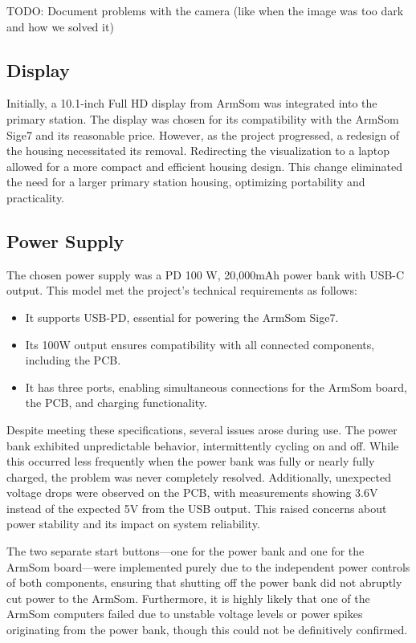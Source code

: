 TODO: Document problems with the camera (like when the image was too dark and how we solved it)

\subsection{Display}
Initially, a 10.1-inch Full HD display from ArmSom was integrated into the primary station. The display was chosen for its compatibility with the ArmSom Sige7 and its reasonable price. However, as the project progressed, a redesign of the housing necessitated its removal. Redirecting the visualization to a laptop allowed for a more compact and efficient housing design. This change eliminated the need for a larger primary station housing, optimizing portability and practicality.

\subsection{Power Supply}
The chosen power supply was a PD 100 W, 20,000mAh power bank with USB-C output. This model met the project's technical requirements as follows:
\begin{itemize}
	\item It supports USB-PD, essential for powering the ArmSom Sige7.
	\item Its 100W output ensures compatibility with all connected components, including the PCB.
	\item It has three ports, enabling simultaneous connections for the ArmSom board, the PCB, and charging functionality.
\end{itemize}

Despite meeting these specifications, several issues arose during use. The power bank exhibited unpredictable behavior, intermittently cycling on and off. While this occurred less frequently when the power bank was fully or nearly fully charged, the problem was never completely resolved. Additionally, unexpected voltage drops were observed on the PCB, with measurements showing 3.6V instead of the expected 5V from the USB output. This raised concerns about power stability and its impact on system reliability.

The two separate start buttons—one for the power bank and one for the ArmSom board—were implemented purely due to the independent power controls of both components, ensuring that shutting off the power bank did not abruptly cut power to the ArmSom. Furthermore, it is highly likely that one of the ArmSom computers failed due to unstable voltage levels or power spikes originating from the power bank, though this could not be definitively confirmed.

